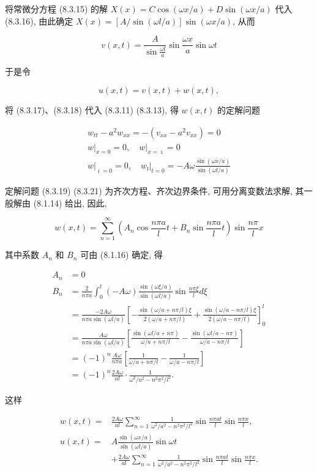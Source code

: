 将常微分方程 (8.3.15) 的解 $X(x)=C \cos (\omega x / a)+D \sin (\omega x / a)$ 代入 (8.3.16), 由此确定 $X(x)=[A / \sin (\omega l / a)] \sin (\omega x / a)$, 从而

$$
v(x, t)=\frac{A}{\sin \frac{\omega l}{a}} \sin \frac{\omega x}{a} \sin \omega t
$$

于是令

$$
u(x, t)=v(x, t)+w(x, t),
$$

将 (8.3.17)、(8.3.18) 代入 (8.3.11) (8.3.13), 得 $w(x, t)$ 的定解问题

$$
\begin{gathered}
w_{t t}-a^{2} w_{x x}=-\left(v_{x x}-a^{2} v_{x x}\right)=0 \\
\left.w\right|_{x=0}=0,\left.\quad w\right|_{x=\imath}=0 \\
\left.w\right|_{\imath=0}=0,\left.\quad w_{\imath}\right|_{t=0}=-A \omega \frac{\sin (\omega x / a)}{\sin (\omega l / a)}
\end{gathered}
$$

定解问题 (8.3.19) (8.3.21) 为齐次方程、齐次边界条件, 可用分离变数法求解, 其一般解由 (8.1.14) 给出, 因此,

$$
w(x, t)=\sum_{n=1}^{\infty}\left(A_{n} \cos \frac{n \pi a}{l} t+B_{n} \sin \frac{n \pi a}{l} t\right) \sin \frac{n \pi}{l} x
$$

其中系数 $A_{n}$ 和 $B_{n}$ 可由 (8.1.16) 确定, 得

$$
\begin{aligned}
A_{n} & =0 \\
B_{n} & =\frac{2}{n \pi a} \int_{0}^{l}(-A \omega) \frac{\sin (\omega \xi / a)}{\sin (\omega l / a)} \sin \frac{n \pi \xi}{l} d \xi \\
& =\frac{-2 A \omega}{n \pi a \sin (\omega l / a)}\left[-\frac{\sin (\omega / a+n \pi / l) \xi}{2(\omega / a+n \pi / l)}+\frac{\sin (\omega / a-n \pi / l) \xi}{2(\omega / a-n \pi / l)}\right]_{0}^{l} \\
& =\frac{A \omega}{n \pi a \sin (\omega l / a)}\left[\frac{\sin (\omega l / a+n \pi)}{\omega / a+n \pi / l}-\frac{\sin (\omega l / a-n \pi)}{\omega / a-n \pi / l}\right] \\
& =(-1)^{n} \frac{A \omega}{n \pi a}\left[\frac{1}{\omega / a+n \pi / l}-\frac{1}{\omega / a-n \pi / l}\right] \\
& =(-1)^{n} \frac{2 A \omega}{a l} \cdot \frac{1}{\omega^{2} / a^{2}-n^{2} \pi^{2} / l^{2}} .
\end{aligned}
$$

这样

$$
\begin{aligned}
w(x, t)= & \frac{2 A \omega}{a l} \sum_{n=1}^{\infty} \frac{1}{\omega^{2} / a^{2}-n^{2} \pi^{2} / l^{2}} \sin \frac{n \pi a t}{l} \sin \frac{n \pi x}{l}, \\
u(x, t)= & A \frac{\sin (\omega x / a)}{\sin (\omega l / a)} \sin \omega t \\
& +\frac{2 A \omega}{a l} \sum_{n=1}^{\infty} \frac{1}{\omega^{2} / a^{2}-n^{2} \pi^{2} / l^{2}} \sin \frac{n \pi a t}{l} \sin \frac{n \pi x}{l} .
\end{aligned}
$$